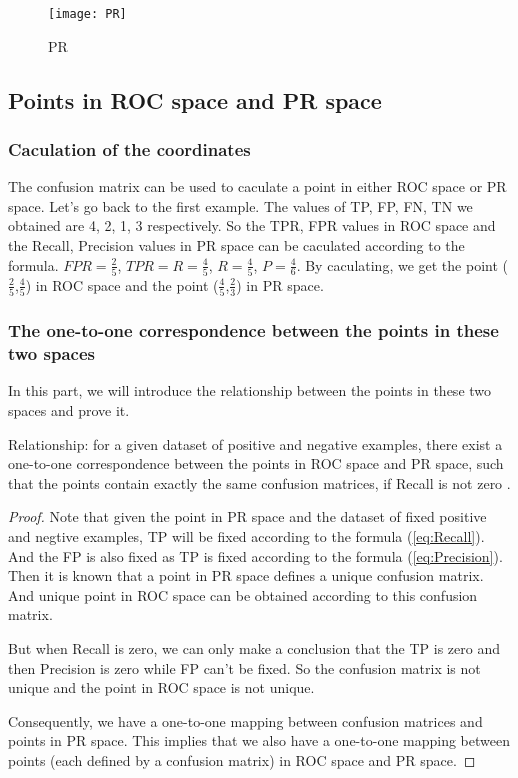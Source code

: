 \documentclass[a4paper,12pt]{article}
\begin{document}
\begin{figure}[!ht]
\centering\texttt{[image: PR]}
\caption{PR}\label{PR:1}
\end{figure} 

\subsection{Points in ROC space and PR space}

\subsubsection{Caculation of the coordinates}
The confusion matrix can be used to caculate a point in either ROC space or PR space. Let's go back to the first example. The values of TP, FP, FN, TN we obtained are 4, 2, 1, 3 respectively. So the TPR, FPR values in ROC space and the Recall, Precision values in PR space can be caculated according to the formula. $FPR=\frac{2}{5}$, $TPR=R=\frac{4}{5}$, $R=\frac{4}{5}$, $P=\frac{4}{6}$. By caculating, we get the point ($\frac{2}{5}$,$\frac{4}{5}$) in ROC space and the point ($\frac{4}{5}$,$\frac{2}{3}$) in PR space.

\subsubsection{The one-to-one correspondence between the points in these two spaces}
In this part, we will introduce the relationship between the points in these two spaces and prove it.

Relationship: for a given dataset of positive and negative examples, there exist a one-to-one correspondence between the points in ROC space and PR space, such that the points contain exactly the same confusion matrices, if Recall is not zero \cite{3:article}.

\begin{proof} Note that given the point in PR space and the dataset of fixed positive and negtive examples, TP will be fixed according to the formula (\ref{eq:Recall}). And the FP is also fixed as TP is fixed according to the formula (\ref{eq:Precision}). Then it is known that a point in PR space defines a unique confusion matrix. And unique point in ROC space can be obtained according to this confusion matrix.

But when Recall is zero, we can only make a conclusion that the TP is zero and then Precision is zero while FP can't be fixed. So the confusion matrix is not unique and the point in ROC space is not unique.

Consequently, we have a one-to-one mapping between confusion matrices and points in PR space. This implies that we also have a one-to-one mapping between points (each defined by a confusion matrix) in ROC space and PR space.
\end{proof}
\end{document}
